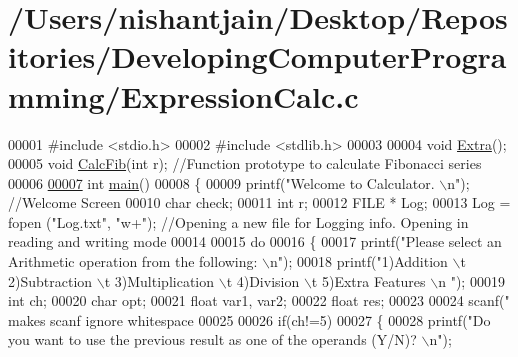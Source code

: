 \hypertarget{_expression_calc_8c_source}{\section{/\+Users/nishantjain/\+Desktop/\+Repositories/\+Developing\+Computer\+Programming/\+Expression\+Calc.c}
}

\begin{DoxyCode}
00001 \textcolor{preprocessor}{#include <stdio.h>}
00002 \textcolor{preprocessor}{#include <stdlib.h>}
00003 
00004 \textcolor{keywordtype}{void} \hyperlink{_expression_calc_8c_a79cd2ba7236d8017474e3340e169f888}{Extra}();
00005 \textcolor{keywordtype}{void} \hyperlink{_expression_calc_8c_a1f044085ede204d3d2ba2e4db44e7e5d}{CalcFib}(\textcolor{keywordtype}{int} r);                                             \textcolor{comment}{//Function prototype to calculate
       Fibonacci series}
00006 
\hypertarget{_expression_calc_8c_source_l00007}{}\hyperlink{_expression_calc_8c_ae66f6b31b5ad750f1fe042a706a4e3d4}{00007} \textcolor{keywordtype}{int} \hyperlink{_expression_calc_8c_ae66f6b31b5ad750f1fe042a706a4e3d4}{main}()
00008 \{
00009   printf(\textcolor{stringliteral}{"Welcome to Calculator. \(\backslash\)n"});                          \textcolor{comment}{//Welcome Screen}
00010   \textcolor{keywordtype}{char} check;
00011   \textcolor{keywordtype}{int} r;
00012   FILE * Log;
00013   Log = fopen (\textcolor{stringliteral}{"Log.txt"}, \textcolor{stringliteral}{"w+"});                            \textcolor{comment}{//Opening a new file for Logging info. Opening
       in reading and writing mode}
00014       
00015     \textcolor{keywordflow}{do}
00016     \{                                                           
00017       printf(\textcolor{stringliteral}{"Please select an Arithmetic operation from the following: \(\backslash\)n"});           
00018       printf(\textcolor{stringliteral}{"1)Addition \(\backslash\)t 2)Subtraction \(\backslash\)t 3)Multiplication \(\backslash\)t 4)Division \(\backslash\)t 5)Extra Features \(\backslash\)n "});
00019       \textcolor{keywordtype}{int} ch;
00020       \textcolor{keywordtype}{char} opt;
00021       \textcolor{keywordtype}{float} var1, var2;
00022       \textcolor{keywordtype}{float} res;
00023       
00024       scanf(\textcolor{stringliteral}{" %
       makes scanf ignore whitespace}
00025       
00026       \textcolor{keywordflow}{if}(ch!=5)
00027       \{
00028         printf(\textcolor{stringliteral}{"Do you want to use the previous result as one of the operands (Y/N)? \(\backslash\)n"});

\end{DoxyCode}
